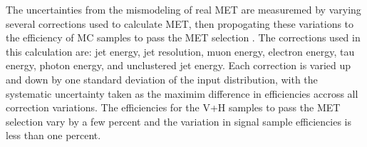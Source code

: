 The uncertainties from the mismodeling of real MET are measuremed by varying several corrections used to calculate MET, then propogating these variations to the efficiency of MC samples to pass the MET selection \cite{mettwiki}. The corrections used in this calculation are:
jet energy,
jet resolution,
muon energy,
electron energy,
tau energy,
photon energy, and
unclustered jet energy. Each correction is varied up and down by one standard deviation of the input distribution, with the systematic uncertainty taken as the maximim difference in efficiencies accross all correction variations. The efficiencies for the V+H samples to pass the MET selection vary by a few percent and the variation in signal sample efficiencies is less than one percent.



